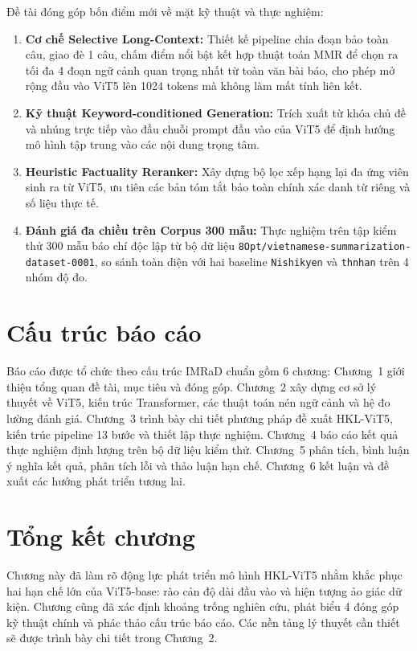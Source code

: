 Đề tài đóng góp bốn điểm mới về mặt kỹ thuật và thực nghiệm:

\begin{enumerate}[label=\arabic*.]
  \item \textbf{Cơ chế Selective Long-Context:} Thiết kế pipeline chia đoạn bảo toàn câu, giao đè 1 câu, chấm điểm nổi bật kết hợp thuật toán MMR để chọn ra tối đa 4 đoạn ngữ cảnh quan trọng nhất từ toàn văn bài báo, cho phép mở rộng đầu vào ViT5 lên 1024 tokens mà không làm mất tính liên kết.
  \item \textbf{Kỹ thuật Keyword-conditioned Generation:} Trích xuất từ khóa chủ đề và nhúng trực tiếp vào đầu chuỗi prompt đầu vào của ViT5 để định hướng mô hình tập trung vào các nội dung trọng tâm.
  \item \textbf{Heuristic Factuality Reranker:} Xây dựng bộ lọc xếp hạng lại đa ứng viên sinh ra từ ViT5, ưu tiên các bản tóm tắt bảo toàn chính xác danh từ riêng và số liệu thực tế.
  \item \textbf{Đánh giá đa chiều trên Corpus 300 mẫu:} Thực nghiệm trên tập kiểm thử 300 mẫu báo chí độc lập từ bộ dữ liệu \texttt{8Opt/vietnamese-summarization-dataset-0001}, so sánh toàn diện với hai baseline \texttt{Nishikyen} và \texttt{thnhan} trên 4 nhóm độ đo.
\end{enumerate}

\section{Cấu trúc báo cáo}

Báo cáo được tổ chức theo cấu trúc IMRaD chuẩn gồm 6 chương:
Chương~1 giới thiệu tổng quan đề tài, mục tiêu và đóng góp.
Chương~2 xây dựng cơ sở lý thuyết về ViT5, kiến trúc Transformer, các thuật toán nén ngữ cảnh và hệ đo lường đánh giá.
Chương~3 trình bày chi tiết phương pháp đề xuất HKL-ViT5, kiến trúc pipeline 13 bước và thiết lập thực nghiệm.
Chương~4 báo cáo kết quả thực nghiệm định lượng trên bộ dữ liệu kiểm thử.
Chương~5 phân tích, bình luận ý nghĩa kết quả, phân tích lỗi và thảo luận hạn chế.
Chương~6 kết luận và đề xuất các hướng phát triển tương lai.

\section{Tổng kết chương}

Chương này đã làm rõ động lực phát triển mô hình HKL-ViT5 nhằm khắc phục hai hạn chế lớn của ViT5-base: rào cản độ dài đầu vào và hiện tượng ảo giác dữ kiện. Chương cũng đã xác định khoảng trống nghiên cứu, phát biểu 4 đóng góp kỹ thuật chính và phác thảo cấu trúc báo cáo. Các nền tảng lý thuyết cần thiết sẽ được trình bày chi tiết trong Chương~2.
